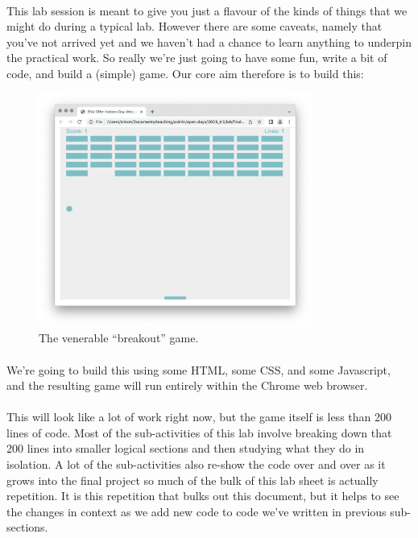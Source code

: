 \documentclass[10pt, a4paper, oneside]{article}
\begin{document}
\paragraph{} This lab session is meant to give you just a flavour of the kinds of things that we might do during a typical lab. However there are some caveats, namely that you've not arrived yet and we haven't had a chance to learn anything to underpin the practical work. So really we're just going to have some fun, write a bit of code, and build a (simple) game. Our core aim therefore is to build this:

\begin{figure}[H]
\centering
\includegraphics[width=0.8\textwidth]{images/breakout.png}
\caption{The venerable ``breakout'' game.}
\label{fig:breakout}
\end{figure}

\paragraph{} We're going to build this using some HTML, some CSS, and some Javascript, and the resulting game will run entirely within the Chrome web browser. 

\paragraph{} This will look like a lot of work right now, but the game itself is less than 200 lines of code. Most of the sub-activities of this lab involve breaking down that 200 lines into smaller logical sections and then studying what they do in isolation. A lot of the sub-activities also re-show the code over and over as it grows into the final project so much of the bulk of this lab sheet is actually repetition. It is this repetition that bulks out this document, but it helps to see the changes in context as we add new code to code we've written in previous sub-sections. 
\end{document}
